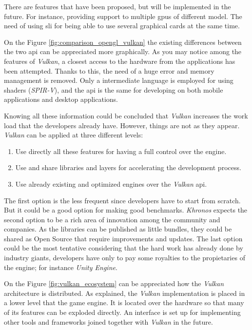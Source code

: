 There are features that have been proposed, but will be implemented in the future. For instance, providing support to
multiple \gls{gpu}s of different model. The need of using \gls{sli} for being able to use several graphical cards at
the same time.

On the Figure \ref{fig:comparison_opengl_vulkan} the existing differences between the two \gls{api} can be appreciated
more graphically. As you may notice among the features of \emph{Vulkan}, a closest access to the hardware from the
applications has been attempted. Thanks to this, the need of a huge error and memory management is removed. Only a
intermediate language is employed for using shaders (\emph{SPIR-V}), and the \gls{api} is the same for developing on
both mobile applications and desktop applications.

Knowing all these information could be concluded that \emph{Vulkan} increases the work load that the developers already
have. However, things are not as they appear. \emph{Vulkan} can be applied at three different levels:

\begin{enumerate}
    \item Use directly all these features for having a full control over the engine.
    \item Use and share libraries and layers for accelerating the development process.
    \item Use already existing and optimized engines over the \emph{Vulkan} \gls{api}.
\end{enumerate}

The first option is the less frequent since developers have to start from scratch. But it could be a good option for
making good benchmarks. \emph{Khronos} expects the second option to be a rich area of innovation among the community and
companies. As the libraries can be published as little bundles, they could be shared as Open Source that require
improvements and updates. The last option could be the most tentative considering that the hard work has already
done by industry giants, developers have only to pay some royalties to the propietaries of the engine; for instance
\emph{Unity Engine}.

On the Figure \ref{fig:vulkan_ecosystem} can be appreciated how the \emph{Vulkan} architecture is distributed. As
explained, the \emph{Vulkan} implementation is placed in a lower level that the game engine. It is located over the
hardware so that many of its features can be exploded directly. An interface is set up for implementing other tools
and frameworks joined together with \emph{Vulkan} in the future.

